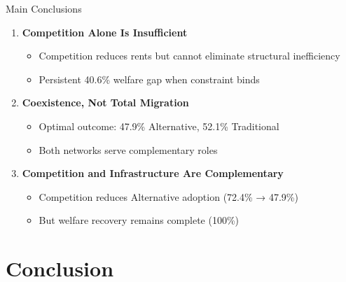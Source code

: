 \documentclass[aspectratio=169]{beamer}
\begin{document}
\begin{frame}{Main Conclusions}
    \begin{enumerate}
        \item \textbf{Competition Alone Is Insufficient}
        \begin{itemize}
            \item Competition reduces rents but cannot eliminate structural inefficiency
            \item Persistent 40.6\% welfare gap when constraint binds
        \end{itemize}
        
        \vspace{0.3cm}
        \item \textbf{Coexistence, Not Total Migration}
        \begin{itemize}
            \item Optimal outcome: 47.9\% Alternative, 52.1\% Traditional
            \item Both networks serve complementary roles
        \end{itemize}
        
        \vspace{0.3cm}
        \item \textbf{Competition and Infrastructure Are Complementary}
        \begin{itemize}
            \item Competition reduces Alternative adoption (72.4\% → 47.9\%)
            \item But welfare recovery remains complete (100\%)
        \end{itemize}
    \end{enumerate}
\end{frame}

\section{Conclusion}
\end{document}
